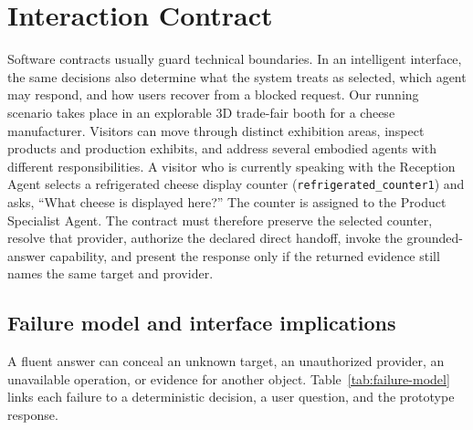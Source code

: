 \section{Interaction Contract}
\label{sec:contract}

Software contracts usually guard technical boundaries.  In an intelligent
interface, the same decisions also determine what the system treats as
selected, which agent may respond, and how users recover from a blocked
request.  Our running scenario takes place in an explorable 3D trade-fair booth
for a cheese manufacturer.  Visitors can move through distinct exhibition
areas, inspect products and production exhibits, and address several embodied
agents with different responsibilities.  A visitor who is currently speaking
with the Reception Agent selects a refrigerated cheese display counter
(\texttt{refrigerated\_counter1}) and asks, ``What cheese is displayed here?''
The counter is assigned to the Product Specialist Agent.  The contract must
therefore preserve the selected counter, resolve that provider, authorize the
declared direct handoff, invoke the grounded-answer capability, and present the
response only if the returned evidence still names the same target and
provider.

\subsection{Failure model and interface implications}

A fluent answer can conceal an unknown target, an unauthorized provider, an
unavailable operation, or evidence for another object.
Table~\ref{tab:failure-model} links each failure to a deterministic decision, a
user question, and the prototype response.

